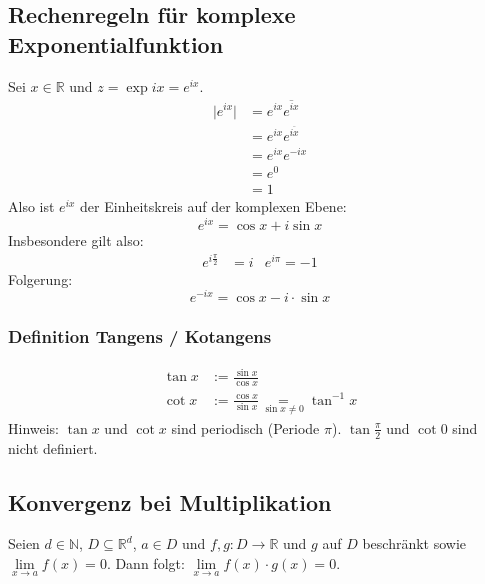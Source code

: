 \documentclass[halfparscip]{scrartcl}
\newcounter{subsection2}
\begin{document}
\subsection*{Rechenregeln für komplexe Exponentialfunktion}
Sei $x \in \mathbb{R}$ und $z = \exp ix = e^{ix}$.
\begin{align*}
	\vert e^{ix}\vert & = e^{ix}\overline{e^{ix}} \\
	                  & = e^{ix}e^{\overline{ix}} \\
	                  & = e^{ix}e^{-ix}           \\
	                  & = e^0                     \\
	                  & = 1
\end{align*}
Also ist $e^{ix}$ der Einheitskreis auf der komplexen Ebene:
\begin{equation*}
	e^{ix} = \cos x + i \sin x
\end{equation*}
Insbesondere gilt also:
\begin{align*}
	e^{i\frac{\pi}{2}} &= i & e^{i\pi} = -1
\end{align*}
Folgerung:
\begin{equation*}
	e^{-ix} = \cos x - i \cdot \sin x
\end{equation*}

\subsubsection*{Definition Tangens / Kotangens}
\begin{align*}
	\tan x & := \frac{\sin x}{\cos x}                                         \\
	\cot x & := \frac{\cos x}{\sin x} \underset{\sin x \neq 0}{=} \tan^{-1} x
\end{align*}
Hinweis: $\tan x$ und $\cot x$ sind periodisch (Periode $\pi$). $\tan \frac{\pi}{2}$ und $\cot 0$ sind nicht definiert.

\subsection{Konvergenz bei Multiplikation}
Seien $d \in \mathbb{N}$, $D \subseteq \mathbb{R}^d$, $a \in D$ und $f,g : D \rightarrow \mathbb{R}$ und $g$ auf $D$ beschränkt sowie \mbox{$\lim\limits_{x \rightarrow a} f(x) = 0$}.
Dann folgt: $\lim\limits_{x \rightarrow a} f(x) \cdot g(x) = 0$.
\end{document}
